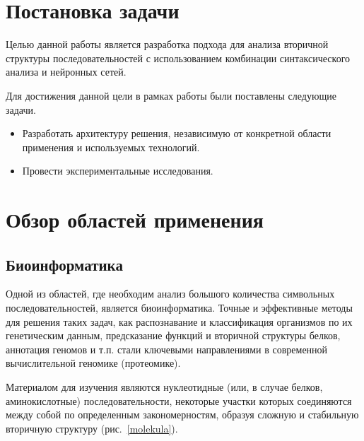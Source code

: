 \documentclass[14pt]{matmex-diploma-custom}
\begin{document}
\section{Постановка задачи}
Целью данной работы является разработка подхода для анализа вторичной структуры последовательностей с использованием комбинации синтаксического анализа и нейронных сетей.

Для достижения данной цели в рамках работы были поставлены следующие задачи.
\begin{itemize}
    \item Разработать архитектуру решения, независимую от конкретной области применения и используемых технологий.
    \item Провести экспериментальные исследования.
\end{itemize}

\section{Обзор областей применения}
\subsection{Биоинформатика}
Одной из областей, где необходим анализ большого количества символьных последовательностей, является биоинформатика. Точные и эффективные методы для решения таких задач, как распознавание и классификация организмов по их генетическим данным, предсказание функций и вторичной структуры белков, аннотация геномов и т.п. стали ключевыми направлениями в современной вычислительной геномике (протеомике). 

Материалом для изучения являются нуклеотидные (или, в случае белков, аминокислотные) последовательности, некоторые участки которых соединяются между собой по определенным закономерностям, образуя сложную и стабильную вторичную структуру (рис.~\ref{molekula}).
\end{document}
